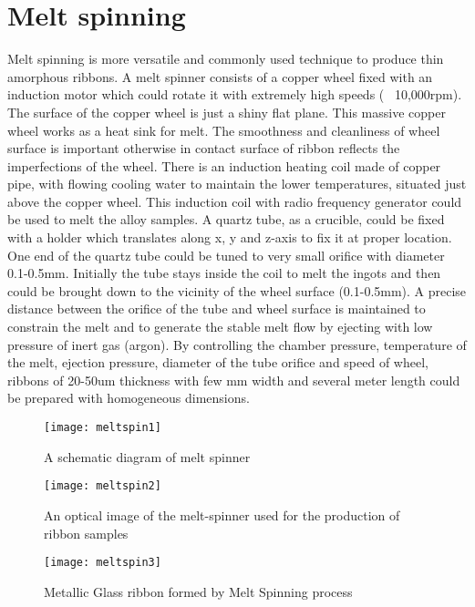 \section{Melt spinning} 
Melt spinning is more versatile and commonly used technique to produce thin amorphous ribbons. A melt spinner consists of a copper wheel fixed with an induction motor which could rotate it with extremely high speeds (~ 10,000rpm). The surface of the copper wheel is just a shiny flat plane. This massive copper wheel works as a heat sink for melt. The smoothness and cleanliness of wheel surface is important otherwise in contact surface of ribbon reflects the imperfections of the wheel. There is an induction heating coil made of copper pipe, with flowing cooling water to maintain the lower temperatures, situated just above the copper wheel. This induction coil with radio frequency generator could be used to melt the alloy samples. A quartz tube, as a crucible, could be fixed with a holder which translates along x, y and z-axis to fix it at proper location. One end of the quartz tube could be tuned to very small orifice with diameter 0.1-0.5mm. Initially the tube stays inside the coil to melt the ingots and then could be brought down to the vicinity of the wheel surface (0.1-0.5mm). A precise distance between the orifice of the tube and wheel surface is maintained to constrain the melt and to generate the stable melt flow by ejecting with low pressure of inert gas (argon). By controlling the chamber pressure, temperature of the melt, ejection pressure, diameter of the tube orifice and speed of wheel, ribbons of 20-50um thickness with few mm width and several meter length could be prepared with homogeneous dimensions.

\begin{figure}[h!]
\centering
\texttt{[image: meltspin1]}
\caption{A schematic diagram of melt spinner}
\end{figure}

\begin{figure}[h!]
\centering
\texttt{[image: meltspin2]}
\caption{An optical image of the melt-spinner used for the production of ribbon samples}
\end{figure}
\begin{figure}[h!]
\centering
\texttt{[image: meltspin3]}
\caption{Metallic Glass ribbon formed by Melt Spinning process}
\end{figure}


